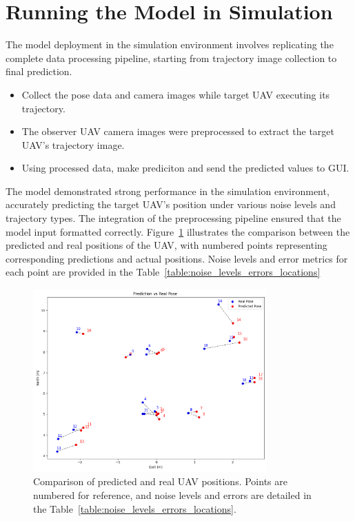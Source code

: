 \section{Running the Model in Simulation}

The model deployment in the simulation environment involves replicating the complete data processing pipeline, starting from trajectory image collection to final prediction.

\begin{itemize}
    \item Collect the pose data and camera images while target UAV executing its trajectory.
    \item The observer UAV camera images were preprocessed to extract the target UAV's trajectory image.
    \item Using processed data, make prediciton and send the predicted values to GUI.
\end{itemize}

The model demonstrated strong performance in the simulation environment, accurately predicting the target UAV's position under various noise levels and trajectory types. The integration of the preprocessing pipeline ensured that the model input formatted correctly. Figure~\ref{fig:prediction_vs_real} illustrates the comparison between the predicted and real positions of the UAV, with numbered points representing corresponding predictions and actual positions. Noise levels and error metrics for each point are provided in the Table~\ref{table:noise_levels_errors_locations}

\begin{figure}[h!]
    \centering
    \includegraphics[width=0.8\textwidth]{Imgs/results.png} %
    \caption{Comparison of predicted and real UAV positions. Points are numbered for reference, and noise levels and errors are detailed in the Table~\ref{table:noise_levels_errors_locations}.}
    \label{fig:prediction_vs_real}
\end{figure}

